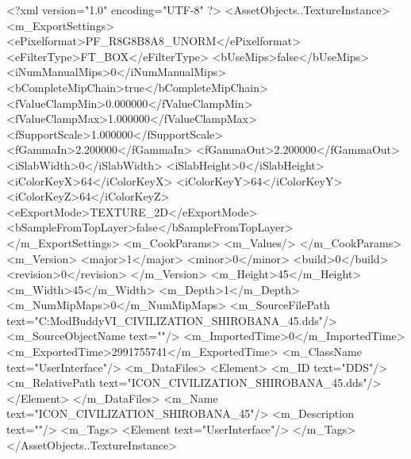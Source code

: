 <?xml version="1.0" encoding="UTF-8" ?>
<AssetObjects..TextureInstance>
	<m_ExportSettings>
		<ePixelformat>PF_R8G8B8A8_UNORM</ePixelformat>
		<eFilterType>FT_BOX</eFilterType>
		<bUseMips>false</bUseMips>
		<iNumManualMips>0</iNumManualMips>
		<bCompleteMipChain>true</bCompleteMipChain>
		<fValueClampMin>0.000000</fValueClampMin>
		<fValueClampMax>1.000000</fValueClampMax>
		<fSupportScale>1.000000</fSupportScale>
		<fGammaIn>2.200000</fGammaIn>
		<fGammaOut>2.200000</fGammaOut>
		<iSlabWidth>0</iSlabWidth>
		<iSlabHeight>0</iSlabHeight>
		<iColorKeyX>64</iColorKeyX>
		<iColorKeyY>64</iColorKeyY>
		<iColorKeyZ>64</iColorKeyZ>
		<eExportMode>TEXTURE_2D</eExportMode>
		<bSampleFromTopLayer>false</bSampleFromTopLayer>
	</m_ExportSettings>
	<m_CookParams>
		<m_Values/>
	</m_CookParams>
	<m_Version>
		<major>1</major>
		<minor>0</minor>
		<build>0</build>
		<revision>0</revision>
	</m_Version>
	<m_Height>45</m_Height>
	<m_Width>45</m_Width>
	<m_Depth>1</m_Depth>
	<m_NumMipMaps>0</m_NumMipMaps>
	<m_SourceFilePath text="C:\Users\asus\Documents\Firaxis ModBuddy\Civilization VI\temppic\ICON_CIVILIZATION_SHIROBANA_45.dds"/>
	<m_SourceObjectName text=""/>
	<m_ImportedTime>0</m_ImportedTime>
	<m_ExportedTime>2991755741</m_ExportedTime>
	<m_ClassName text="UserInterface"/>
	<m_DataFiles>
		<Element>
			<m_ID text="DDS"/>
			<m_RelativePath text="ICON_CIVILIZATION_SHIROBANA_45.dds"/>
		</Element>
	</m_DataFiles>
	<m_Name text="ICON_CIVILIZATION_SHIROBANA_45"/>
	<m_Description text=""/>
	<m_Tags>
		<Element text="UserInterface"/>
	</m_Tags>
</AssetObjects..TextureInstance>


